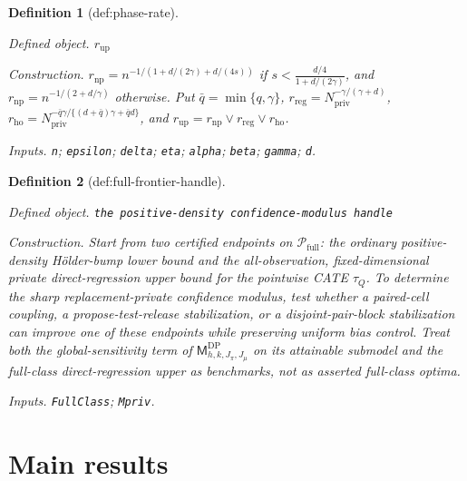 \documentclass{article}
\newtheorem{definition}{Definition}
\begin{document}
\begin{definition}[def:phase-rate]\label{def:phase-rate}
\par\smallskip\noindent\emph{Defined object.} \(r_{\mathrm{up}}\)
\par\smallskip\noindent\emph{Construction.} \(r_{\mathrm{np}}=n^{-1/(1+d/(2\gamma)+d/(4s))}\) if \(s<\frac{d/4}{1+d/(2\gamma)}\), and \(r_{\mathrm{np}}=n^{-1/(2+d/\gamma)}\) otherwise.  Put \(\bar q=\min\{q,\gamma\}\), \(r_{\mathrm{reg}}=N_{\mathrm{priv}}^{-\gamma/(\gamma+d)}\), \(r_{\mathrm{ho}}=N_{\mathrm{priv}}^{-\bar q\gamma/\{(d+\bar q)\gamma+\bar q d\}}\), and \(r_{\mathrm{up}}=r_{\mathrm{np}}\vee r_{\mathrm{reg}}\vee r_{\mathrm{ho}}\).
\par\smallskip\noindent\emph{Inputs.} \texttt{n}; \texttt{epsilon}; \texttt{delta}; \texttt{eta}; \texttt{alpha}; \texttt{beta}; \texttt{gamma}; \texttt{d}.
\end{definition}

\begin{definition}[def:full-frontier-handle]\label{def:full-frontier-handle}
\par\smallskip\noindent\emph{Defined object.} \texttt{the positive-\allowbreak{}density confidence-\allowbreak{}modulus handle}
\par\smallskip\noindent\emph{Construction.} Start from two certified endpoints on \(\mathcal P_{\mathrm{full}}\): the ordinary positive-density H\"older-bump lower bound and the all-observation, fixed-dimensional private direct-regression upper bound for the pointwise CATE \(\tau_Q\).  To determine the sharp replacement-private confidence modulus, test whether a paired-cell coupling, a propose-test-release stabilization, or a disjoint-pair-block stabilization can improve one of these endpoints while preserving uniform bias control.  Treat both the global-sensitivity term of \(\mathsf M_{h,k,J_\pi,J_\mu}^{\mathrm{DP}}\) on its attainable submodel and the full-class direct-regression upper as benchmarks, not as asserted full-class optima.
\par\smallskip\noindent\emph{Inputs.} \texttt{FullClass}; \texttt{Mpriv}.
\end{definition}

\section{Main results}
\end{document}
